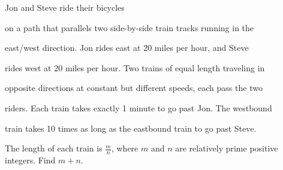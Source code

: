 Jon and Steve ride their bicycles

 on a path that parallels two side-by-side train tracks running in the 

east/west direction. Jon rides east at 20 miles per hour, and Steve 

rides west at 20 miles per hour. Two trains of equal length traveling in

 opposite directions at constant but different speeds, each pass the two

 riders. Each train takes exactly 1 minute to go past Jon. The westbound

 train takes 10 times as long as the eastbound train to go past Steve. 

The length of each train is $\tfrac mn$,  where $m$ and $n$ are relatively prime positive integers. Find $m+n$.